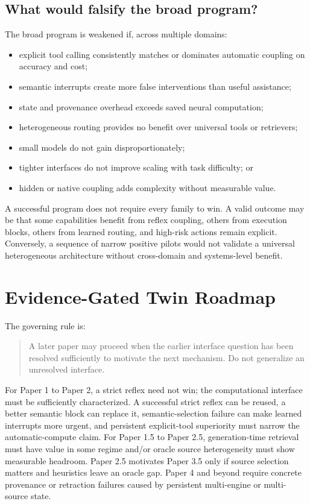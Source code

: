 \documentclass[11pt]{article}
\begin{document}
\subsection{What would falsify the broad program?}

The broad program is weakened if, across multiple domains:
\begin{itemize}
  \item explicit tool calling consistently matches or dominates automatic
  coupling on accuracy and cost;
  \item semantic interrupts create more false interventions than useful assistance;
  \item state and provenance overhead exceeds saved neural computation;
  \item heterogeneous routing provides no benefit over universal tools or retrievers;
  \item small models do not gain disproportionately;
  \item tighter interfaces do not improve scaling with task difficulty; or
  \item hidden or native coupling adds complexity without measurable value.
\end{itemize}

A successful program does not require every family to win.  A valid outcome may
be that some capabilities benefit from reflex coupling, others from execution
blocks, others from learned routing, and high-risk actions remain explicit.
Conversely, a sequence of narrow positive pilots would not validate a universal
heterogeneous architecture without cross-domain and systems-level benefit.

\section{Evidence-Gated Twin Roadmap}

The governing rule is:

\begin{quote}
A later paper may proceed when the earlier interface question has been resolved
sufficiently to motivate the next mechanism.  Do not generalize an unresolved
interface.
\end{quote}

For Paper 1 to Paper 2, a strict reflex need not win; the computational
interface must be sufficiently characterized.  A successful strict reflex can
be reused, a better semantic block can replace it, semantic-selection failure
can make learned interrupts more urgent, and persistent explicit-tool
superiority must narrow the automatic-compute claim.  For Paper 1.5 to Paper
2.5, generation-time retrieval must have value in some regime and/or oracle
source heterogeneity must show measurable headroom.  Paper 2.5 motivates Paper
3.5 only if source selection matters and heuristics leave an oracle gap.  Paper
4 and beyond require concrete provenance or retraction failures caused by
persistent multi-engine or multi-source state.
\end{document}
